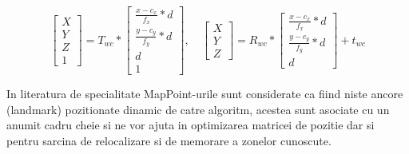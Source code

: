 \documentclass[12pt,a4paper]{report}
\begin{document}
\begin{equation} 
\begin{bmatrix}
X \\
Y \\
Z \\
1
\end{bmatrix} = T_{wc} *  
\begin{bmatrix}
\frac{x - c_x}{f_x} * d \\
\frac{y- c_y}{f_y} * d \\
d \\
1
\end{bmatrix}, \quad{}
\begin{bmatrix}
    X \\
    Y \\
    Z 
\end{bmatrix} = R_{wc} *
\begin{bmatrix}
    \frac{x - c_x}{f_x} * d \\
    \frac{y- c_y}{f_y} * d \\
    d
    \end{bmatrix} + t_{wc}
\end{equation}

In literatura de specialitate MapPoint-urile sunt considerate ca fiind 
niste ancore (landmark) pozitionate dinamic de catre algoritm, acestea sunt asociate
cu un anumit cadru cheie si ne vor ajuta in optimizarea matricei de pozitie dar si
pentru sarcina de relocalizare si de memorare a zonelor cunoscute.
\end{document}
